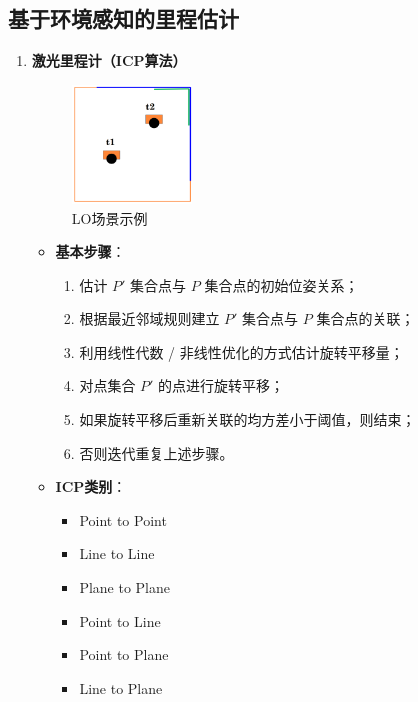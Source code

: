 \documentclass[../main.tex]{subfiles}
\begin{document}
\subsection{基于环境感知的里程估计}
\begin{enumerate}
\item \textbf{激光里程计（ICP算法）}\label{laser}
                    \begin{figure}[H]
                        \centering
                        \includegraphics[width=0.3\textwidth]{images/laser.png}
                        \caption{LO场景示例}
                    \end{figure}
    \begin{itemize}
        \item \textbf{基本步骤}：
        \begin{enumerate}
            \item 估计 $P'$ 集合点与 $P$ 集合点的初始位姿关系；
            \item 根据最近邻域规则建立 $P'$ 集合点与 $P$ 集合点的关联；
            \item 利用线性代数 / 非线性优化的方式估计旋转平移量；
            \item 对点集合 $P'$ 的点进行旋转平移；
            \item 如果旋转平移后重新关联的均方差小于阈值，则结束；
            \item 否则迭代重复上述步骤。
        \end{enumerate}

        \item \textbf{ICP类别}：
        \begin{itemize}
            \item Point to Point
            \item Line to Line
            \item Plane to Plane
            \item Point to Line
            \item Point to Plane
            \item Line to Plane
        \end{itemize}


\end{itemize}
\end{enumerate}
\end{document}
